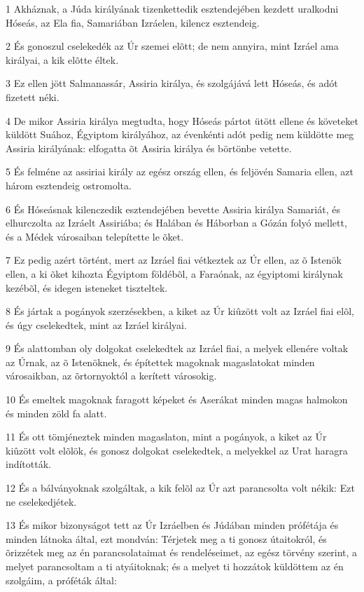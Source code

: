 \par 1 Akháznak, a Júda királyának tizenkettedik esztendejében kezdett uralkodni Hóseás, az Ela fia, Samariában Izráelen, kilencz esztendeig.
\par 2 És gonoszul cselekedék az Úr szemei elõtt; de nem annyira, mint Izráel ama királyai, a kik elõtte éltek.
\par 3 Ez ellen jött Salmanassár, Assiria királya, és szolgájává lett Hóseás, és adót fizetett néki.
\par 4 De mikor Assiria királya megtudta, hogy Hóseás pártot ütött ellene és követeket küldött Suához, Égyiptom királyához, az évenkénti adót pedig nem küldötte meg Assiria királyának: elfogatta õt Assiria királya és börtönbe vetette.
\par 5 És felméne az assiriai király az egész ország ellen, és feljövén Samaria ellen, azt három esztendeig ostromolta.
\par 6 És Hóseásnak kilenczedik esztendejében bevette Assiria királya Samariát, és elhurczolta az Izráelt Assiriába; és Halában és Háborban a Gózán folyó mellett, és a Médek városaiban telepítette le õket.
\par 7 Ez pedig azért történt, mert az Izráel fiai vétkeztek az Úr ellen, az õ Istenök ellen, a ki õket kihozta Égyiptom földébõl, a Faraónak, az égyiptomi királynak kezébõl, és idegen isteneket tiszteltek.
\par 8 És jártak a pogányok szerzésekben, a kiket az Úr kiûzött volt az Izráel fiai elõl, és úgy cselekedtek, mint az Izráel királyai.
\par 9 És alattomban oly dolgokat cselekedtek az Izráel fiai, a melyek ellenére voltak az Úrnak, az õ Istenöknek, és építettek magoknak magaslatokat minden városaikban, az õrtornyoktól a kerített városokig.
\par 10 És emeltek magoknak faragott képeket és Aserákat minden magas halmokon és minden zöld fa alatt.
\par 11 És ott tömjéneztek minden magaslaton, mint a pogányok, a kiket az Úr kiûzött volt elõlök, és gonosz dolgokat cselekedtek, a melyekkel az Urat haragra indították.
\par 12 És a bálványoknak szolgáltak, a kik felõl az Úr azt parancsolta volt nékik: Ezt ne cselekedjétek.
\par 13 És mikor bizonyságot tett az Úr Izráelben és Júdában minden prófétája és minden látnoka által, ezt mondván: Térjetek meg  a ti gonosz útaitokról, és õrizzétek meg az én parancsolataimat és rendeléseimet, az egész törvény szerint, a melyet parancsoltam a ti atyáitoknak; és a melyet ti hozzátok küldöttem az én szolgáim, a próféták által:
